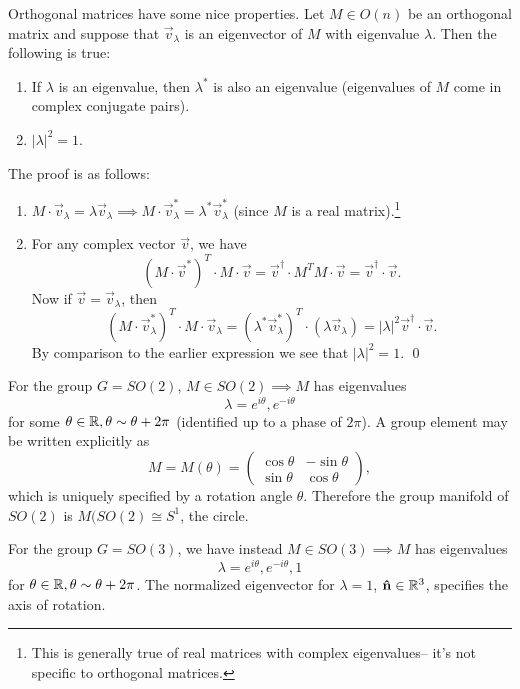 Orthogonal matrices have some nice properties. Let $M \in O(n)$ be an orthogonal matrix and suppose that $\vec{v}_\lambda$ is an eigenvector of $M$ with eigenvalue $\lambda.$ Then the following is true:
\begin{enumerate}
\item If $\lambda$ is an eigenvalue, then $\lambda^*$ is also an eigenvalue (eigenvalues of $M$ come in complex conjugate pairs).
\item $|\lambda|^2=1$.
\end{enumerate}
The proof is as follows:
\begin{enumerate}
\item $M\cdot \vec{v}_\lambda = \lambda \vec{v}_\lambda \implies M\cdot \vec{v}_\lambda^* = \lambda^* \vec{v}_\lambda^*$ (since $M$ is a real matrix).\footnote{This is generally true of real matrices with complex eigenvalues-- it's not specific to orthogonal matrices.}
\item For any complex vector $\vec{v}$, we have
$$(M\cdot \vec{v}^*)^T \cdot M \cdot \vec{v} = \vec{v}^\dagger \cdot M^T M \cdot \vec{v} = \vec{v}^\dagger \cdot \vec{v}.$$ Now if $\vec{v}=\vec{v}_\lambda$, then
$$(M\cdot \vec{v}_\lambda^*)^T \cdot M \cdot \vec{v}_\lambda=(\lambda^* \vec{v}^*_\lambda)^T \cdot (\lambda \vec{v}_\lambda)=|\lambda|^2 \vec{v}^\dagger \cdot \vec{v}.$$
By comparison to the earlier expression we see that $|\lambda|^2=1$. \qed
\end{enumerate}

\begin{exm}
For the group $G=SO(2)$, $M\in SO(2)\implies M$ has eigenvalues
$$\lambda=e^{i\theta},e^{-i\theta}$$ for some $\theta\in\mathbb{R},\theta \sim \theta+2\pi$ (identified up to a phase of $2\pi$). A group element may be written explicitly as
$$M=M(\theta)=\begin{pmatrix}
\cos\theta & -\sin\theta\\
\sin\theta & \cos\theta
\end{pmatrix},$$
which is uniquely specified by a rotation angle $\theta$. Therefore the group manifold of $SO(2)$ is $M(SO(2)\cong S^1$, the circle.
\end{exm}
\begin{exm}
For the group $G=SO(3)$, we have instead $M\in SO(3)\implies M$ has eigenvalues
$$\lambda=e^{i\theta},e^{-i\theta},1$$ for $\theta\in \mathbb{R},\theta \sim \theta+2\pi$.
The normalized eigenvector for $\lambda=1$, $\mathbf{\hat{n}} \in \mathbb{R}^3$, specifies the axis of rotation.
\end{exm}